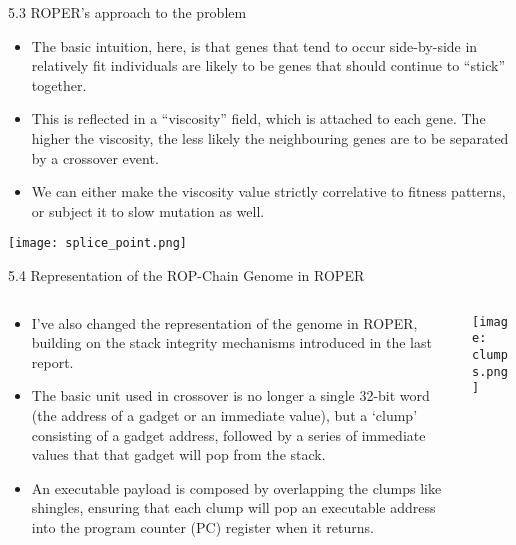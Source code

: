 \documentclass[9pt]{beamer}
\begin{document}
\begin{frame}{5.3 ROPER's approach to the problem}


\begin{itemize}
    \item The basic intuition, here, is that genes that tend to occur side-by-side in relatively fit individuals are likely to be genes that should continue to ``stick'' together.
    \item This is reflected in a ``viscosity'' field, which is attached to each gene. The higher the viscosity, the less likely the neighbouring genes are to be separated by a crossover event.
    \item We can either make the viscosity value strictly correlative to fitness patterns, or subject it to slow mutation as well.
\end{itemize}

\begin{center}
\texttt{[image: splice\_point.png]}
\end{center}

\end{frame}

\begin{frame}{5.4 Representation of the ROP-Chain Genome in ROPER}
\begin{columns}



\begin{column}{0.6\textwidth}
    
\begin{itemize}
    \item I've also changed the representation of the genome in ROPER, building on the stack integrity mechanisms introduced in the last report. 
    
    \item The basic unit used in crossover is no longer a single 32-bit word (the address of a gadget or an immediate value), but a `clump' consisting of a gadget address, followed by a series of immediate values that that gadget will pop from the stack. 
    
    \item An executable payload is composed by overlapping the clumps like shingles, ensuring that each clump will pop an executable address into the program counter (PC) register when it returns.
    \end{itemize}
    \end{column}
\begin{column}{0.4\textwidth}
    \texttt{[image: clumps.png]}
\end{column}
\end{columns}


\end{frame}
\end{document}
